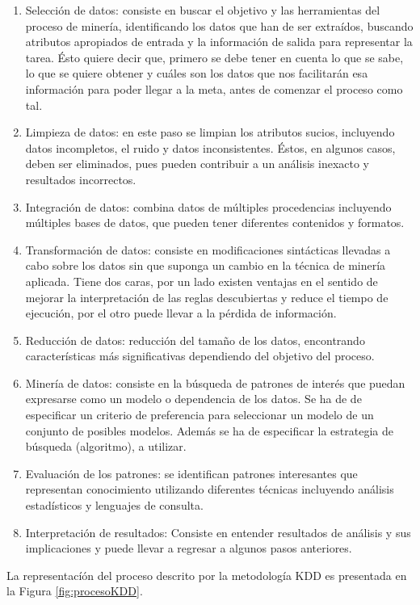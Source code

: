 \begin{enumerate}
\item Selección de datos: consiste en buscar el objetivo y las herramientas del proceso de minería, identificando los datos que han de ser extraídos, buscando atributos apropiados de entrada y la información de salida para representar la tarea. Ésto quiere decir que, primero se debe tener en cuenta lo que se sabe, lo que se quiere obtener y cuáles son los datos que nos facilitarán esa información para poder llegar a la meta, antes de comenzar el proceso como tal.
\item Limpieza de datos: en este paso se limpian los atributos sucios, incluyendo datos incompletos, el ruido y datos inconsistentes. Éstos, en algunos casos, deben ser eliminados, pues pueden contribuir a un análisis inexacto y resultados incorrectos.
\item Integración de datos:  combina datos de múltiples procedencias incluyendo múltiples bases de datos, que pueden tener diferentes contenidos y formatos.
\item Transformación de datos: consiste en modificaciones sintácticas llevadas a cabo sobre los datos sin que suponga un cambio en la técnica de minería aplicada. Tiene dos caras, por un lado existen ventajas en el sentido de mejorar la interpretación de las reglas descubiertas y reduce el tiempo de ejecución, por el otro puede llevar a la pérdida de información.
\item Reducción de datos: reducción del tamaño de los datos, encontrando características más significativas dependiendo del objetivo del proceso.
\item Minería de datos: consiste en la búsqueda de patrones de interés que puedan expresarse como un modelo o dependencia de los datos. Se ha de de especificar un criterio de preferencia para seleccionar un modelo de un conjunto de posibles modelos. Además se ha de especificar la estrategia de búsqueda (algoritmo), a utilizar.
\item Evaluación de los patrones: se identifican patrones interesantes que representan conocimiento utilizando diferentes técnicas incluyendo análisis estadísticos y lenguajes de consulta.
\item Interpretación de resultados: Consiste en entender resultados de análisis y sus implicaciones y puede llevar a regresar a algunos pasos anteriores.
\end{enumerate}

La representacíón del proceso descrito por la metodología KDD es presentada en la Figura \ref{fig:procesoKDD}.

